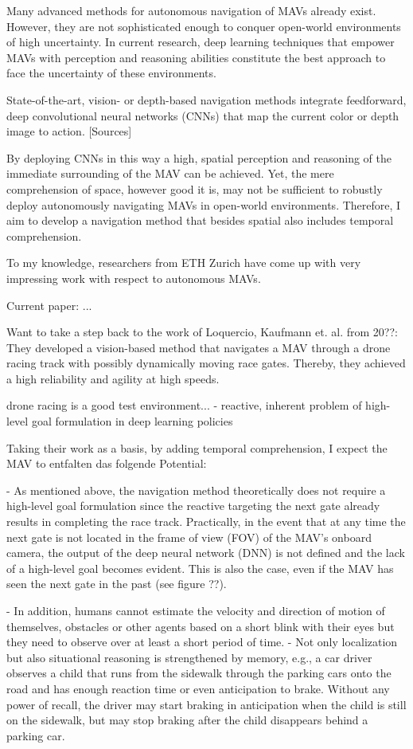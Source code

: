 Many advanced methods for autonomous navigation of MAVs already exist.
However, they are not sophisticated enough to conquer open-world environments of high uncertainty.
In current research, deep learning techniques
that empower MAVs with perception and reasoning abilities
constitute the best approach to face the uncertainty of these environments.


State-of-the-art, vision- or depth-based navigation methods 
integrate feedforward, deep convolutional neural networks (CNNs)
that map the current color or depth image to action. [Sources]

By deploying CNNs in this way a high, spatial perception and reasoning 
of the immediate surrounding of the MAV can be achieved.
Yet, the mere comprehension of space, however good it is,
may not be sufficient to robustly deploy autonomously navigating MAVs in 
open-world environments.
Therefore, I aim to develop a navigation method that besides spatial
also includes temporal comprehension.


To my knowledge, researchers from ETH Zurich have come up with very impressing work 
with respect to autonomous MAVs.

Current paper: ...

Want to take a step back to the work of Loquercio, Kaufmann et. al. \cite{Kaufmann2018} from 20??:
They developed a vision-based method that navigates a MAV through a drone racing 
track with possibly dynamically moving race gates.
Thereby, they achieved a high reliability and agility at high speeds.

drone racing is a good test environment...
- reactive, inherent problem of high-level goal formulation in deep learning policies

Taking their work as a basis,
by adding temporal comprehension,
I expect the MAV to entfalten das folgende Potential:

- As mentioned above, the navigation method theoretically does not require a high-level goal formulation
since the reactive targeting the next gate already results in completing the race track.
Practically, in the event that at any time the next gate is not located 
in the frame of view (FOV) of the MAV's onboard camera,
the output of the deep neural network (DNN) is not defined and the lack of a high-level goal becomes evident.
This is also the case, even if the MAV has seen the next gate in the past (see figure ??).

- In addition, humans cannot estimate the velocity and direction of motion of themselves, obstacles or other agents
based on a short blink with their eyes but they need to observe over at least a short period of time.
- Not only localization but also situational reasoning is strengthened by memory,
e.g., a car driver observes a child that runs from the sidewalk through the parking cars onto the road
and has enough reaction time or even anticipation to brake.
Without any power of recall, the driver may start braking in anticipation
when the child is still on the sidewalk, but may stop braking after the child disappears behind a parking car.

